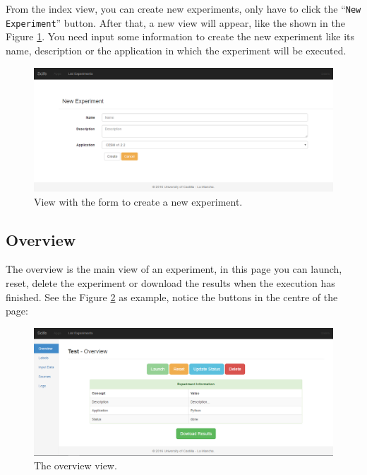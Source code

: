 \documentclass[11pt]{article}
\begin{document}
From the index view, you can create new experiments, only have to click the ``\texttt{New Experiment}'' button. After that, a new view will appear, like the shown in the Figure \ref{fig:create}. You need input some information to create the new experiment like its name, description or the application in which the experiment will be executed.
\begin{figure}[htp]
	\centering
	\includegraphics[width=\linewidth]{img/create}
	\caption{View with the form to create a new experiment.}
	\label{fig:create}
\end{figure}

\subsection{Overview}\label{sec:overview}
The overview is the main view of an experiment, in this page you can launch, reset, delete the experiment or download the results when the execution has finished. See the Figure \ref{fig:overview-done} as example, notice the buttons in the centre of the page:
\begin{figure}[htp]
	\centering
	\includegraphics[width=\linewidth]{img/overview-done}
	\caption{The overview view.}
	\label{fig:overview-done}
\end{figure}
\end{document}
